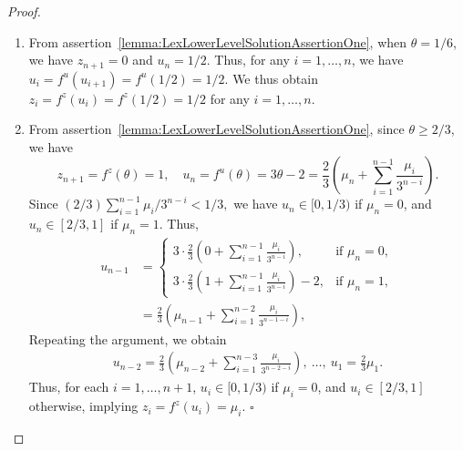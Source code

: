 \documentclass[runningheads,orivec]{llncs}
\newcommand{\MacroColor}[1]{#1}
\newcommand{\MyQED}{\mbox{}\hfill$\square$}
\newcommand{\NVariables}{\MacroColor{n}}
\newcommand{\ReformZ}{\MacroColor{z}}
\newcommand{\ReformAugFrac}{\MacroColor{f}}
\newcommand{\LexUVar}{\MacroColor{\theta}}
\newcommand{\LexLVarS}{\MacroColor{s}}
\newcommand{\LexLVarT}{\MacroColor{t}}
\newcommand{\LexLVarU}{\MacroColor{u}}
\newcommand{\LexLVarFuncU}{\MacroColor{f^u}}
\newcommand{\LexLVarFuncZ}{\MacroColor{f^z}}
\newcommand{\BinaryVector}{\MacroColor{\mu}}
\begin{document}
\begin{appendix}
\begin{proof}
\begin{enumerate}
\begin{alignat*}{3}
&
\LexLVarU_{i - 1} = \LexLVarFuncU(\LexLVarU_i),
&&
\quad
&&
\forall i = 2, \ldots, \NVariables + 1, \notag 
\\
&
0 \le \ReformZ_i, \ReformAugFrac_i, \LexLVarS_i, \LexLVarT_i, \LexLVarU_i \le 1,
&&
&&
\forall i = 1, \ldots, \NVariables + 1,
\notag
\end{alignat*}
implying the desired results.
\item
From assertion~\ref{lemma:LexLowerLevelSolutionAssertionOne}, when $\LexUVar = 1/6$, we have $\ReformZ_{\NVariables + 1} = 0$ and $\LexLVarU_{\NVariables} = 1/2$.
Thus, for any $i = 1, \ldots, n$, we have $\LexLVarU_i = \LexLVarFuncU(\LexLVarU_{i + 1}) = \LexLVarFuncU(1 / 2) = 1/2$.
We thus obtain $\ReformZ_i = \LexLVarFuncZ(\LexLVarU_{i}) = \LexLVarFuncZ(1 / 2) = 1/2$ for any $i = 1, \ldots, \NVariables$.
\item 
From assertion~\ref{lemma:LexLowerLevelSolutionAssertionOne}, since $\LexUVar \ge 2/3$, we have
$$
\ReformZ_{\NVariables + 1} = \LexLVarFuncZ(\LexUVar) = 1,
\quad
\LexLVarU_{\NVariables} = \LexLVarFuncU(\LexUVar) = 
3 \LexUVar - 2
=
\frac{2}{3}\left(\BinaryVector_{\NVariables} + \sum_{i = 1}^{\NVariables - 1} \frac{\BinaryVector_i}{3^{\NVariables - i}}\right).
$$
Since 
$
(2/3) \sum_{i = 1}^{\NVariables - 1} 
\BinaryVector_i/3^{\NVariables - i}
< 1/3,
$
we have $\LexLVarU_{\NVariables} \in [0, 1/3)$ if $\BinaryVector_{\NVariables} = 0$, and $\LexLVarU_{\NVariables} \in [2/3, 1]$ if $\BinaryVector_{\NVariables} = 1$.
Thus, 
\begin{align*}
\LexLVarU_{\NVariables - 1} 
&= 
\begin{cases}
\displaystyle
3 \cdot \frac{2}{3}\left(0 + \sum_{i = 1}^{\NVariables - 1} \frac{\BinaryVector_i}{3^{\NVariables - i}}\right), 
&
\text{if } \BinaryVector_{\NVariables} = 0,
\\[1em]
\displaystyle
3 \cdot \frac{2}{3}\left(1 + \sum_{i = 1}^{\NVariables - 1} \frac{\BinaryVector_i}{3^{\NVariables - i}}\right) - 2,
&
\text{if } \BinaryVector_{\NVariables} = 1,
\end{cases}
\\
&=
\frac{2}{3}\left(\BinaryVector_{\NVariables - 1} + \sum_{i = 1}^{\NVariables - 2} \frac{\BinaryVector_i}{3^{\NVariables - 1 - i}}\right), 
\end{align*}
Repeating the argument, we obtain
\begin{align*}
\LexLVarU_{\NVariables - 2} = \frac{2}{3}\left(\BinaryVector_{\NVariables - 2} + \sum_{i = 1}^{\NVariables - 3} \frac{\BinaryVector_i}{3^{\NVariables - 2 - i}}\right), 
\
\hdots,
\
\LexLVarU_{1} = \frac{2}{3} \BinaryVector_1.
\end{align*}
Thus, for each $i = 1, \ldots, \NVariables + 1$, $\LexLVarU_i \in [0, 1/3)$ if $\mu_i = 0$, and $\LexLVarU_i \in [2/3, 1]$ otherwise, implying $\ReformZ_i = \LexLVarFuncZ(\LexLVarU_i) = \BinaryVector_i$.
\MyQED
\end{enumerate}
\end{proof}


\end{appendix}
\end{document}
